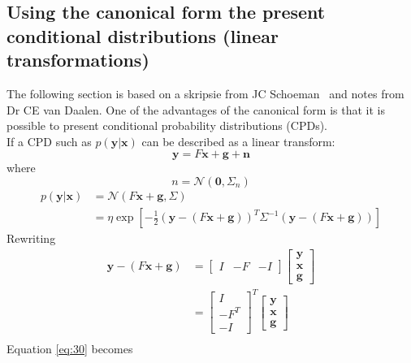 \documentclass[12pt,oneside,openany,a4paper, %
afrikaans,english,
]{memoir}
\numberwithin{equation}{chapter}
\begin{document}
\subsection{Using the canonical form the present conditional distributions (linear transformations)}
The following section is based on a skripsie from JC Schoeman~\cite{JC} and notes from Dr CE van Daalen. One of the advantages of the canonical form is that it is possible to present conditional probability distributions (CPDs). \\
If a CPD such as $p(\bm{y}|\bm{x})$ can be described as a linear transform:
\begin{equation}
\bm{y} = F\bm{x} + \bm{g} + \bm{n}
\end{equation}
where
\begin{equation}
n = \mathcal{N}(\bm{0}, \Sigma_n)
\end{equation}
\begin{equation}
\label{eq:30}
\begin{split}
p(\bm{y}|\bm{x}) & = \mathcal{N}(F\bm{x} + \bm{g}, \Sigma) \\
& = \eta\exp\left[-\frac{1}{2}(\bm{y} - (F\bm{x} + \bm{g}))^T\Sigma^{-1}(\bm{y}-(F\bm{x} + \bm{g}))\right]
\end{split}
\end{equation}
Rewriting
\begin{equation}
\begin{split}
\bm{y} - (F\bm{x} + \bm{g}) & =
\begin{bmatrix}
I&-F&-I
\end{bmatrix}
\begin{bmatrix}
\bm{y}\\
\bm{x}\\
\bm{g}
\end{bmatrix}\\
& =
\begin{bmatrix}
I\\-F^T\\-I
\end{bmatrix}^T
\begin{bmatrix}
\bm{y}\\
\bm{x}\\
\bm{g}
\end{bmatrix}\\
\end{split}
\end{equation}
Equation \ref{eq:30} becomes
\end{document}

